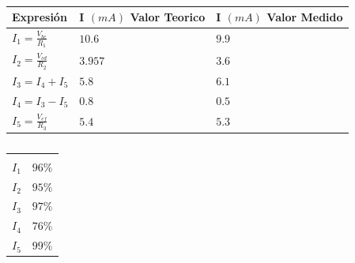 \documentclass[twocolumn, 12pt]{article}
\begin{document}
\begin{table}[H]
    \captionsetup{justification=centering}
    \centering

    \begin{tabularx}{0.9\linewidth}{|>{\centering\arraybackslash}X|>{\centering\arraybackslash}X|>{\centering\arraybackslash}X|}
        \hline
        Expresión                  & I $(mA)$ Valor Teorico & I $(mA)$ Valor Medido \\\hline
        $I_1 = \frac{V_{bc}}{R_1}$ & $10.6$                 & $9.9$                 \\ \hline
        $I_2 = \frac{V_{cd}}{R_2}$ & $3.957$                & $3.6$                 \\ \hline
        $I_3 = I_4 + I_5$          & $5.8$                  & $6.1$                 \\ \hline
        $I_4 = I_3 - I_5$          & $0.8$                  & $0.5$                 \\ \hline
        $I_5 = \frac{V_{ef}}{R_3}$ & $5.4$                  & $5.3$                 \\ \hline
    \end{tabularx}

    \vspace{.2cm}

    \begin{tabularx}{0.9\linewidth}{|>{\centering\arraybackslash}X|>{\centering\arraybackslash}X|}
        \hline
        \multicolumn{2}{|c|}{Exactitud}                                                                       \\\hline
        \multicolumn{2}{|c|}{$1 - (\frac{ValorMedido - ValorTeorico}{ValorMedido + ValorTeorico}) \cdot 100$} \\\hline
        $I_1$ & $96\%$                                                                                        \\\hline
        $I_2$ & $95\%$                                                                                        \\\hline
        $I_3$ & $97\%$                                                                                        \\\hline
        $I_4$ & $76\%$                                                                                        \\\hline
        $I_5$ & $99\%$                                                                                        \\\hline
    \end{tabularx}

    \caption{}

    \label{tab:analisisDatos__11}
\end{table}
\end{document}
